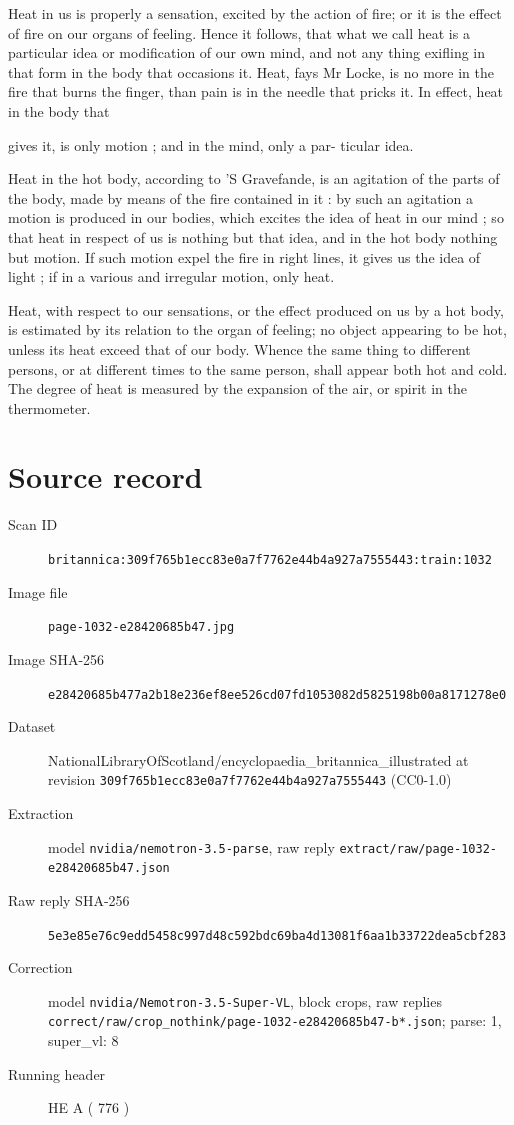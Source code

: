 \documentclass{article}
\begin{document}
Heat in us is properly a sensation, excited by the action of fire; or it is the effect of fire on our organs of feeling. Hence it follows, that what we call heat is a particular idea or modification of our own mind, and not any thing exifling in that form in the body that occasions it. Heat, fays Mr Locke, is no more in the fire that burns the finger, than pain is in the needle that pricks it. In effect, heat in the body that

gives it, is only motion ; and in the mind, only a par-
ticular idea.

Heat in the hot body, according to 'S Gravefande, is an agitation of the parts of the body, made by means of the fire contained in it : by such an agitation a motion is produced in our bodies, which excites the idea of heat in our mind ; so that heat in respect of us is nothing but that idea, and in the hot body nothing but motion. If such motion expel the fire in right lines, it gives us the idea of light ; if in a various and irregular motion, only heat.

Heat, with respect to our sensations, or the effect produced on us by a hot body, is estimated by its relation to the organ of feeling; no object appearing to be hot, unless its heat exceed that of our body. Whence the same thing to different persons, or at different times to the same person, shall appear both hot and cold. The degree of heat is measured by the expansion of the air, or spirit in the thermometer.


\section*{Source record}
\begin{description}
\item[Scan ID] \texttt{britannica:309f765b1ecc83e0a7f7762e44b4a927a7555443:train:1032}
\item[Image file] \texttt{page-1032-e28420685b47.jpg}
\item[Image SHA-256] \texttt{e28420685b477a2b18e236ef8ee526cd07fd1053082d5825198b00a8171278e0}
\item[Dataset] NationalLibraryOfScotland/encyclopaedia\_britannica\_illustrated at revision \texttt{309f765b1ecc83e0a7f7762e44b4a927a7555443} (CC0-1.0)
\item[Extraction] model \texttt{nvidia/nemotron-3.5-parse}, raw reply \texttt{extract/raw/page-1032-e28420685b47.json}
\item[Raw reply SHA-256] \texttt{5e3e85e76c9edd5458c997d48c592bdc69ba4d13081f6aa1b33722dea5cbf283}
\item[Correction] model \texttt{nvidia/Nemotron-3.5-Super-VL}, block crops, raw replies \texttt{correct/raw/crop\_nothink/page-1032-e28420685b47-b*.json}; parse: 1, super\_vl: 8
\item[Running header] HE A ( 776 )
\end{description}
\end{document}
